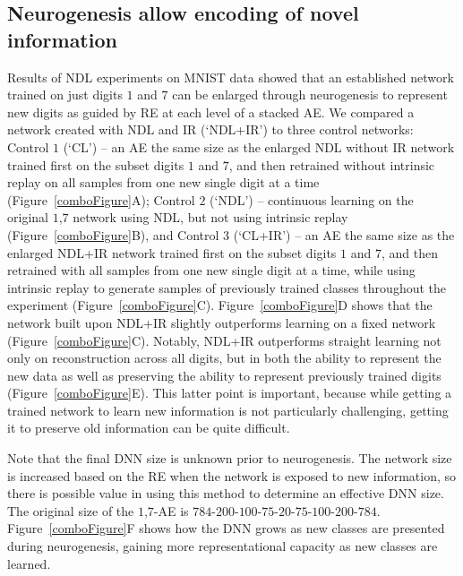 \documentclass[10pt,conference]{IEEEtran}
\begin{document}
\subsection{Neurogenesis allow encoding of novel information}
Results of NDL experiments on MNIST data showed that an established network trained on just digits $1$ and $7$ can be enlarged through neurogenesis to represent new digits as guided by RE at each level of a stacked AE. We compared a network created with NDL and IR (`NDL+IR') to three control networks: Control $1$ (`CL') – an AE the same size as the enlarged NDL without IR network trained first on the subset digits $1$ and $7$, and then retrained without intrinsic replay on all samples from one new single digit at a time (Figure~\ref{comboFigure}A); Control $2$ (`NDL') – continuous learning on the original $1$,$7$ network using NDL, but not using intrinsic replay (Figure~\ref{comboFigure}B), and Control $3$ (`CL+IR') – an AE the same size as the enlarged NDL+IR network trained first on the subset digits $1$ and $7$, and then retrained with all samples from one new single digit at a time, while using intrinsic replay to generate samples of previously trained classes throughout the experiment (Figure~\ref{comboFigure}C). Figure~\ref{comboFigure}D shows that the network built upon NDL+IR slightly outperforms learning on a fixed network (Figure~\ref{comboFigure}C). Notably, NDL+IR outperforms straight learning not only on reconstruction across all digits, but in both the ability to represent the new data as well as preserving the ability to represent previously trained digits (Figure~\ref{comboFigure}E). This latter point is important, because while getting a trained network to learn new information is not particularly challenging, getting it to preserve old information can be quite difficult.

Note that the final DNN size is unknown prior to neurogenesis. The network size is increased based on the RE when the network is exposed to new information, so there is possible value in using this method to determine an effective DNN size. The original size of the $1$,$7$-AE is $784$-$200$-$100$-$75$-$20$-$75$-$100$-$200$-$784$. Figure~\ref{comboFigure}F shows how the DNN grows as new classes are presented during neurogenesis, gaining more representational capacity as new classes are learned. 
\end{document}
